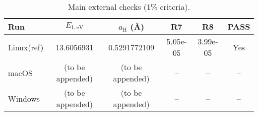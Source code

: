 \begin{table}[t]
\caption{Main external checks (1\% criteria).}\label{tab:main}
\centering
\begin{tabular}{lccccc}
\toprule
Run & $E_{1,\mathrm{eV}}$ & $a_{\mathrm{H}}$ (\AA) & R7 & R8 & PASS \\
\midrule
Linux(ref) & 13.6056931 & 0.5291772109 & 5.05e-05 & 3.99e-05 & Yes \\
macOS & (to be appended) & (to be appended) & -- & -- & -- \\
Windows & (to be appended) & (to be appended) & -- & -- & -- \\
\bottomrule
\end{tabular}
\end{table}
